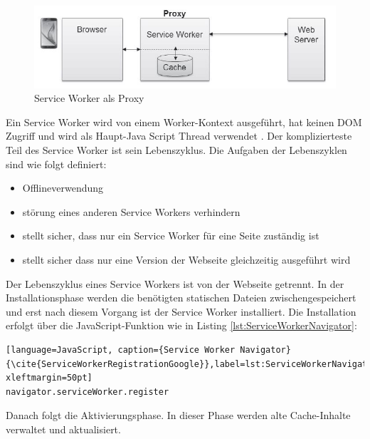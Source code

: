 \begin{figure}[h]
	\centering
	\includegraphics[width=14cm]{BilderAllgemein/SWProxy}\medskip
	\caption{Service Worker als Proxy \cite{SWProxy}}
	\label{fig:SWProxy}
\end{figure}

Ein Service Worker wird von einem Worker-Kontext ausgeführt, hat keinen DOM Zugriff und wird als Haupt-Java Script Thread verwendet \cite{Worker} \cite{ServiceWorker}.
Der komplizierteste Teil des Service Worker ist sein Lebenszyklus. 
\newpage
Die Aufgaben der Lebenszyklen sind wie folgt definiert:

\begin{itemize}
    \item  Offlineverwendung
	\item  störung eines anderen Service Workers verhindern
	\item  stellt sicher, dass nur ein Service Worker für eine Seite zuständig ist
	\item  stellt sicher dass nur eine Version der Webseite gleichzeitig ausgeführt wird
\end{itemize}


Der Lebenszyklus eines Service Workers ist von der Webseite getrennt.
In der Installationsphase werden die benötigten statischen Dateien zwischengespeichert und erst nach diesem Vorgang ist der Service Worker installiert. Die Installation erfolgt über die JavaScript-Funktion wie in Listing \ref{lst:ServiceWorkerNavigator}:

\begin{lstlisting}[language=JavaScript, caption={Service Worker Navigator} {\cite{ServiceWorkerRegistrationGoogle}},label=lst:ServiceWorkerNavigator, xleftmargin=50pt]
navigator.serviceWorker.register
\end{lstlisting}

Danach folgt die Aktivierungsphase. In dieser Phase werden alte Cache-Inhalte verwaltet und aktualisiert.




